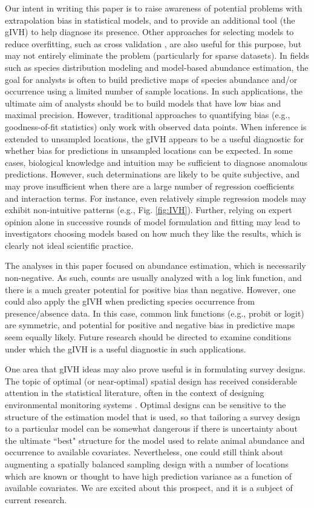 \documentclass[12pt,english]{article}
\begin{document}
\begin{spacing}{1.9}
Our intent in writing this paper is to raise awareness of potential problems with extrapolation bias in statistical models, and to provide an additional tool (the gIVH) to help diagnose its presence.  Other approaches for selecting models to reduce overfitting, such as cross validation \citep[e.g.,][]{PicardCook1984}, are also useful for this purpose, but may not entirely eliminate the problem (particularly for sparse datasets). In fields such as species distribution modeling and model-based abundance estimation, the goal for analysts is often to build predictive maps of species abundance and/or occurrence using a limited number of sample locations.
In such applications, the ultimate aim of analysts should be to build models that have low bias and maximal precision.  However, traditional approaches to quantifying bias (e.g., goodness-of-fit statistics) only work with observed data points.  When inference is extended to unsampled locations, the gIVH appears to be a useful diagnostic for whether bias for predictions in unsampled locations can be expected.  In some cases, biological knowledge and intuition may be sufficient to diagnose anomalous predictions.  However, such determinations are likely to be quite subjective, and may prove insufficient when there are a large number of regression coefficients and interaction terms.  For instance, even relatively simple regression models may exhibit non-intuitive patterns (e.g., Fig. \ref{fig:IVH}).  Further, relying on expert opinion alone in successive rounds of model formulation and fitting may lead to investigators choosing models based on how much they like the results, which is clearly not ideal scientific practice.

The analyses in this paper focused on abundance estimation, which is necessarily non-negative.  As such, counts are usually analyzed with a log link function, and there is a much greater potential for positive bias than negative.  However, one could also apply the gIVH when predicting species occurrence from presence/absence data.  In this case, common link functions (e.g., probit or logit) are symmetric, and potential for positive and negative bias in predictive maps seem equally likely.  Future research should be directed to examine conditions under which the gIVH is a useful diagnostic in such applications.

One area that gIVH ideas may also prove useful is in formulating survey designs.  The topic of optimal (or near-optimal) spatial design has received considerable attention in the statistical literature, often in the context of designing environmental monitoring systems \citep{Muller2007}.  Optimal designs can be sensitive to the structure of the estimation model that is used, so that tailoring a survey design to a particular model can be somewhat dangerous if there is uncertainty about the ultimate ``best" structure for the model used to relate animal abundance and occurrence to available covariates.  Nevertheless, one could still think about augmenting a spatially balanced sampling design with a number of locations which are known or thought to have high prediction variance as a function of available covariates.  We are excited about this prospect, and it is a subject of current research.



\end{spacing}
\end{document}
